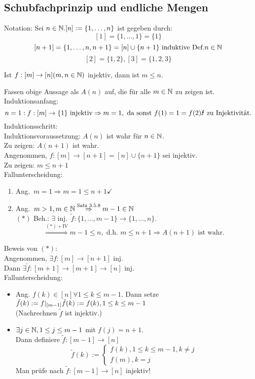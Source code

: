 \documentclass[../ana1.tex]{subfiles}
\begin{document}
\subsection{Schubfachprinzip und endliche Mengen}
Notation: Sei \(n\in\mathbb{N}. [n] := \{1,\ldots,n\} \) ist gegeben durch:
\[ [1] = \{1,\ldots,1\} = \{1\} \]
\[ [n+1] = \{1,\ldots,n,n+1\} = [n] \cup \{n+1\}\text{ induktive Def.} n\in\mathbb{N} \]
\[ [2]=\{1,2\}, [3]=\{1,2,3\} \]
\begin{satz}[Schubfachprinzip]
	Ist \(f:[m]\rightarrow [n] (m,n\in\mathbb{N}) \) injektiv, dann ist \(m\leq n\).
\end{satz}
\begin{bew}
	Fassen obige Aussage als \(A(n)\) auf, die für alle \(m\in\mathbb{N} \) zu zeigen ist.\\
	Induktionsanfang:
	\[ n=1: f:[m] \rightarrow \{1\} \text{ injektiv} \Rightarrow m=1, \text{ da sonst } f(1) = 1 = f(2) \text{\Lightning{} zu Injektivität}.\]
	Induktionsschritt:\\
	Induktionsvoraussetzung: \(A(n)\) ist wahr für \(n\in\mathbb{N} \).\\
	Zu zeigen: \(A(n+1)\) ist wahr.\\
	Angenommen, \(f:[m]\rightarrow[n+1] = [n] \cup \{n+1\} \) sei injektiv.\\
	Zu zeigen: \(m\leq n+1\) \\
	Fallunterscheidung:
	\begin{enumerate}
		\item Ang.\  \(m=1 \Rightarrow m=1\leq n+1\checkmark{}\)
		\item Ang.\  \(m>1, m\in\mathbb{N} \overset{\text{Satz 3.5.8}}{\Rightarrow} m-1\in\mathbb{N} \) \\
		      \((*)\) Beh.: \(\exists \) inj.\  \(\tilde{f}: \{1,\ldots,m-1\}\rightarrow \{1,\ldots,n\} \).\\
		      \[ \overset{(*) + \text{IV}}{\Rightarrow} m-1\leq n, \text{ d.h. } m\leq n+1 \Rightarrow A(n+1) \text{ ist wahr}.\]
	\end{enumerate}
	Beweis von \((*)\):\\
	Angenommen, \(\exists f: [m]\rightarrow[n+1]\) inj.\\
	Dann \(\exists \tilde{f}: [m+1]\rightarrow [m+1]\rightarrow[n]\) inj.\\
	Fallunterscheidung:
	\begin{itemize}
		\item Ang. \(f(k)\in [n] \forall 1\leq k \leq m-1\). Dann setze \(\tilde{f}(k) := f\vert_{[m-1]}\\
			  \tilde{f}(k) := f(k), 1\leq k\leq m-1\) \\
		      (Nachrechnen \(\tilde{f}\) ist injektiv.)
		\item \(\exists j\in\mathbb{N}, 1\leq j\leq m-1\) mit \(f(j) = n+1\).\\
		      Dann definiere \(\tilde{f}: [m-1]\rightarrow [n]\)
		      \[\tilde{f}(k) :=
			      	\begin{cases}
				    	f(k), 1 \leq k \leq m-1, k\neq j \\
				      	f(m), k=j
			      	\end{cases}\]
		      Man prüfe nach \(\tilde{f}: [m-1]\rightarrow [n]\) injektiv!
	\end{itemize}
\end{bew}
\end{document}
